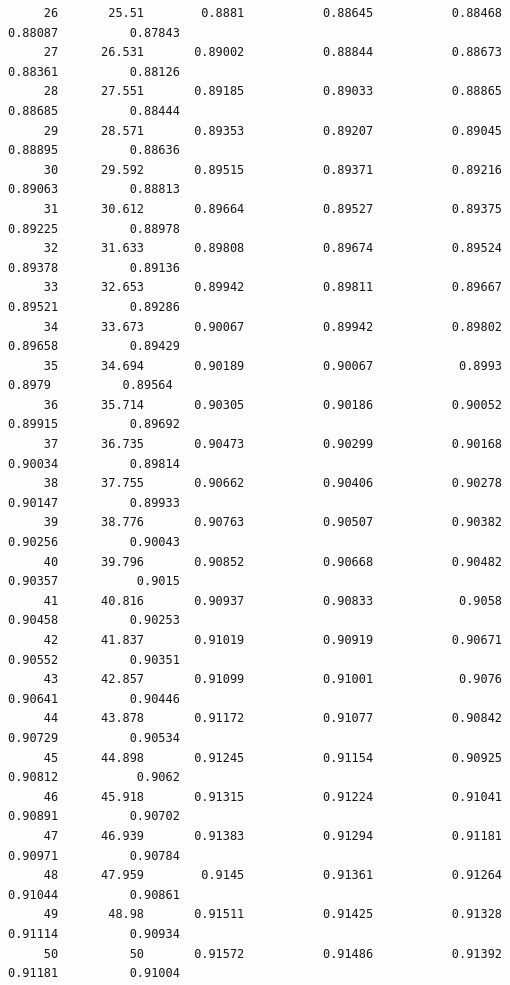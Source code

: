 \documentclass[
]{book}
\begin{document}
\begin{verbatim}
     26       25.51        0.8881           0.88645           0.88468           0.88087          0.87843   
     27      26.531       0.89002           0.88844           0.88673           0.88361          0.88126   
     28      27.551       0.89185           0.89033           0.88865           0.88685          0.88444   
     29      28.571       0.89353           0.89207           0.89045           0.88895          0.88636   
     30      29.592       0.89515           0.89371           0.89216           0.89063          0.88813   
     31      30.612       0.89664           0.89527           0.89375           0.89225          0.88978   
     32      31.633       0.89808           0.89674           0.89524           0.89378          0.89136   
     33      32.653       0.89942           0.89811           0.89667           0.89521          0.89286   
     34      33.673       0.90067           0.89942           0.89802           0.89658          0.89429   
     35      34.694       0.90189           0.90067            0.8993            0.8979          0.89564   
     36      35.714       0.90305           0.90186           0.90052           0.89915          0.89692   
     37      36.735       0.90473           0.90299           0.90168           0.90034          0.89814   
     38      37.755       0.90662           0.90406           0.90278           0.90147          0.89933   
     39      38.776       0.90763           0.90507           0.90382           0.90256          0.90043   
     40      39.796       0.90852           0.90668           0.90482           0.90357           0.9015   
     41      40.816       0.90937           0.90833            0.9058           0.90458          0.90253   
     42      41.837       0.91019           0.90919           0.90671           0.90552          0.90351   
     43      42.857       0.91099           0.91001            0.9076           0.90641          0.90446   
     44      43.878       0.91172           0.91077           0.90842           0.90729          0.90534   
     45      44.898       0.91245           0.91154           0.90925           0.90812           0.9062   
     46      45.918       0.91315           0.91224           0.91041           0.90891          0.90702   
     47      46.939       0.91383           0.91294           0.91181           0.90971          0.90784   
     48      47.959        0.9145           0.91361           0.91264           0.91044          0.90861   
     49       48.98       0.91511           0.91425           0.91328           0.91114          0.90934   
     50          50       0.91572           0.91486           0.91392           0.91181          0.91004   
\end{verbatim}
\end{document}

